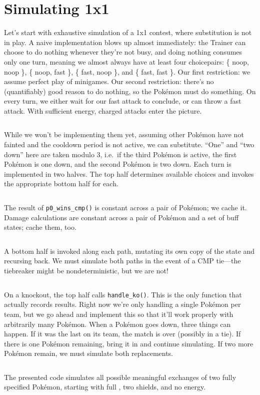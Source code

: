 \section{Simulating 1x1\label{sec:simul1x1}}
Let's start with exhaustive simulation of a 1x1 contest,
 where substitution is not in play.
A naive implementation blows up almost immediately: the Trainer can choose to do nothing
 whenever they're not busy, and doing nothing consumes only one turn,
 meaning we almost always have at least four choicepairs:
 \{ noop, noop \}, \{ noop, fast \}, \{ fast, noop \}, and \{ fast, fast \}.
Our first restriction: we assume perfect play of minigames.
Our second restriction: there's no (quantifiably) good reason to do nothing,
 so the Pokémon must do something.
On every turn, we either wait for our fast attack to conclude, or can throw a fast attack.
With sufficient energy, charged attacks enter the picture.
\inputminted{cpp}{book-simul-code/sift.h}
While we won't be implementing them yet, assuming other Pokémon have not
  fainted and the cooldown period is not active, we can substitute.
``One'' and ``two down'' here are taken modulo 3, i.e.\ if the third Pokémon is
  active, the first Pokémon is one down, and the second Pokémon is two down.
Each turn is implemented in two halves.
The top half determines available choices and invokes the appropriate bottom half for each.
\inputminted{cpp}{book-simul-code/top.h}
The result of \texttt{p0\_wins\_cmp()} is constant across a pair of Pokémon; we cache it.
Damage calculations are constant across a pair of Pokémon and a set of buff states; cache them, too.
\inputminted{cpp}{book-simul-code/in.h}
A bottom half is invoked along each path, mutating its own copy of the state and recursing back.
We must simulate both paths in the event of a CMP tie---the tiebreaker might be nondeterministic, but we are not!
\inputminted{cpp}{book-simul-code/bottom.h}
On a knockout, the top half calls \texttt{handle\_ko()}.
This is the only function that actually records results.
Right now we're only handling a single Pokémon per team, but we go ahead and implement this so that it'll work properly
 with arbitrarily many Pokémon.
When a Pokémon goes down, three things can happen.
If it was the last on its team, the match is over (possibly in a tie).
If there is one Pokémon remaining, bring it in and continue simulating.
If two more Pokémon remain, we must simulate both replacements.
\inputminted{cpp}{book-simul-code/ko.h}
The presented code simulates all possible meaningful exchanges of two fully specified Pokémon, starting
  with full \HP{}, two shields, and no energy.

